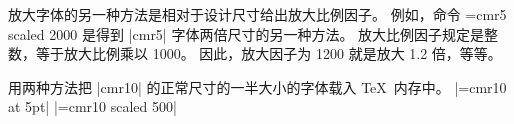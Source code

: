 \danger 放大字体的另一种方法是相对于设计尺寸给出放大比例因子。%
例如，命令
\begintt
\font\magnifiedfiverm=cmr5 scaled 2000
\endtt
\1是得到 |cmr5| 字体两倍尺寸的另一种方法。%
放大比例因子规定是整数，等于放大比例乘以 1000。%
因此，放大因子为 1200 就是放大 1.2 倍，等等。

\dangerexercise 用两种方法把 |cmr10| 的正常尺寸的一半大小的字体载入 \TeX\ 内存中。
\answer |\font\squinttenrm=cmr10 at 5pt|\parbreak
        |\font\squinttenrm=cmr10 scaled 500|

